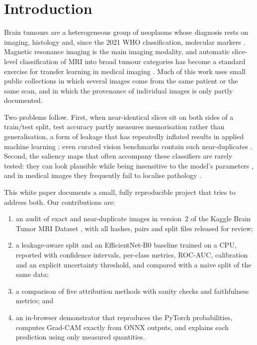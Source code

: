 \documentclass[11pt,a4paper]{article}
\begin{document}
\section{Introduction}
Brain tumours are a heterogeneous group of neoplasms whose diagnosis rests on imaging, histology and, since the 2021 WHO classification, molecular markers \citep{louis2021}. Magnetic resonance imaging is the main imaging modality, and automatic slice-level classification of MRI into broad tumour categories has become a standard exercise for transfer learning in medical imaging \citep{deepak2019,swati2019,badza2020}. Much of this work uses small public collections in which several images come from the same patient or the same scan, and in which the provenance of individual images is only partly documented.

Two problems follow. First, when near-identical slices sit on both sides of a train/test split, test accuracy partly measures memorisation rather than generalisation, a form of leakage that has repeatedly inflated results in applied machine learning \citep{kapoor2023,roberts2021}; even curated vision benchmarks contain such near-duplicates \citep{barz2020}. Second, the saliency maps that often accompany these classifiers are rarely tested: they can look plausible while being insensitive to the model's parameters \citep{adebayo2018}, and in medical images they frequently fail to localise pathology \citep{arun2021,saporta2022}.

This white paper documents a small, fully reproducible project that tries to address both. Our contributions are:
\begin{enumerate}
\item an audit of exact and near-duplicate images in version~2 of the Kaggle Brain Tumor MRI Dataset \citep{nickparvar2021}, with all hashes, pairs and split files released for review;
\item a leakage-aware split and an EfficientNet-B0 \citep{tan2019} baseline trained on a CPU, reported with confidence intervals, per-class metrics, ROC-AUC, calibration and an explicit uncertainty threshold, and compared with a naive split of the same data;
\item a comparison of five attribution methods with sanity checks and faithfulness metrics; and
\item an in-browser demonstrator that reproduces the PyTorch probabilities, computes Grad-CAM exactly from ONNX outputs, and explains each prediction using only measured quantities.
\end{enumerate}
\end{document}
